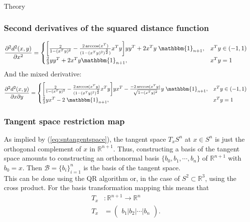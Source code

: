 \begin{chapter}{Theory}
\subsubsection{Second derivatives of the squared distance function} %
\label{ssub:SecondDerS2}
\begin{equation}
    \frac{\partial^2 d^2(x,y)}{\partial x^2}=\begin{cases}
	\bigg[\frac{2}{1-(x^Ty)^2}-\frac{2\arccos(x^T)}{(1-(x^Ty)^{2})^{\frac{3}{2}})}x^Ty\bigg]yy^T+2x^Ty\;\mathbbm{1}_{n+1}, & x^Ty\in(-1,1)\\
	\frac{2}{3}yy^T+2x^Ty\mathbbm{1}_{n+1}, & x^Ty=1
    \end{cases}
\end{equation}
And the mixed derivative:
\begin{equation}
    \frac{\partial^2 d^2(x,y)}{\partial x\partial y}=\begin{cases}
	\bigg[\frac{2}{1-(x^Ty)^2}-\frac{2\arccos(x^Ty)}{(1-(x^Ty)^{2})^{\frac{3}{2}}}x^Ty\bigg]yx^T-\frac{-2\arccos(x^Ty)}{\sqrt{1-(x^Ty)^{2}}}y\;\mathbbm{1}_{n+1} , & x^Ty\in(-1,1)\\
	\frac{2}{3}yx^T -2\;\mathbbm{1}_{n+1}, & x^Ty=1
    \end{cases}
\end{equation}


\subsubsection{Tangent space restriction map} %
\label{ssub:TangentS2}
As implied by (\ref{eq:sntangentspace}), the tangent space $T_xS^n$ at $x\in S^n$ is just the orthogonal complement of $x$ in $\mathbb{R}^{n+1}$.
Thus, constructing a basis of the tangent space amounts to constructing an orthonormal basis $\lbrace b_0,b_1,\cdots,b_n\rbrace$ of $\mathbb{R}^{n+1}$ with $b_0=x$. Then
$\mathcal{B}=\lbrace b_i\rbrace_{i=1}^{n}$ is the basis of the tangent space.\\
This can be done using the QR algorithm or, in the case of $S^2\subset\mathbb{R}^3$, using the cross product. For the basis transformation mapping this means that
\begin{align}
    T_x &: \mathbb{R}^{n+1}\to \mathbb{R}^{n}\\
    T_x &= \begin{pmatrix}
    b_1 | b_2 | \cdots | b_n
    \end{pmatrix}.
\end{align}


\end{chapter}
